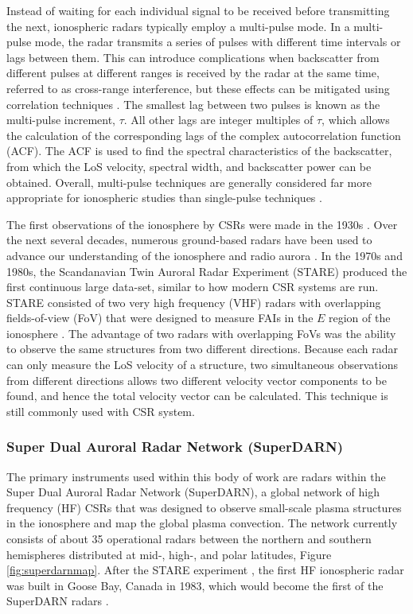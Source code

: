 Instead of waiting for each individual signal to be received before transmitting the next, ionospheric radars typically employ a multi-pulse mode. In a multi-pulse mode, the radar transmits a series of pulses with different time intervals or lags between them.  This can introduce complications when backscatter from different pulses at different ranges is received by the radar at the same time, referred to as cross-range interference, but these effects can be mitigated using correlation techniques \citep{Farley1972}.  The smallest lag between two pulses is known as the multi-pulse increment, \(\tau\).  All other lags are integer multiples of \(\tau\), which allows the calculation of the corresponding lags of the complex autocorrelation function (ACF).  The ACF is used to find the spectral characteristics of the backscatter, from which the LoS velocity, spectral width, and backscatter power can be obtained.  Overall, multi-pulse techniques are generally considered far more appropriate for ionospheric studies than single-pulse techniques \citep{Farley1972,Greenwald1983,Greenwald1985,Barthes1998,Ponomarenko2006}.

The first observations of the ionosphere by CSRs were made in the 1930s \citep{Eckersley1937,Harang1938}.  Over the next several decades, numerous ground-based radars have been used to advance our understanding of the ionosphere and radio aurora \citep{Hultqvist1964,Leadabrand1965,Unwin1972,Sahr1996}.  In the 1970s and 1980s, the Scandanavian Twin Auroral Radar Experiment (STARE) produced the first continuous large data-set, similar to how modern CSR systems are run.  STARE consisted of two very high frequency (VHF) radars with overlapping fields-of-view (FoV) that were designed to measure FAIs in the \(E\) region of the ionosphere \citep{Greenwald1997}.  The advantage of two radars with overlapping FoVs was the ability to observe the same structures from two different directions.  Because each radar can only measure the LoS velocity of a structure, two simultaneous observations from different directions allows two different velocity vector components to be found, and hence the total velocity vector can be calculated.  This technique is still commonly used with CSR system.

\subsubsection{Super Dual Auroral Radar Network (SuperDARN)}
\label{sec:superdarn}
The primary instruments used within this body of work are radars within the Super Dual Auroral Radar Network (SuperDARN), a global network of high frequency (HF) CSRs that was designed to observe small-scale plasma structures in the ionosphere and map the global plasma convection.  The network currently consists of about 35 operational radars between the northern and southern hemispheres distributed at mid-, high-, and polar latitudes, Figure \ref{fig:superdarnmap}.  After the STARE experiment \citep{Greenwald1978}, the first HF ionospheric radar was built in Goose Bay, Canada in 1983, which would become the first of the SuperDARN radars \citep{Greenwald1985}.  


